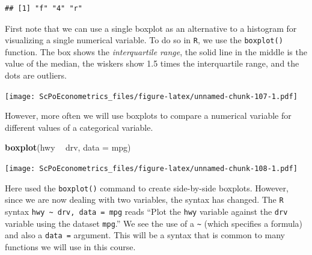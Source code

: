 \documentclass[]{book}
\newenvironment{Shaded}{\begin{snugshade}}{\end{snugshade}}
\newcommand{\KeywordTok}[1]{\textcolor[rgb]{0.13,0.29,0.53}{\textbf{#1}}}
\newcommand{\DataTypeTok}[1]{\textcolor[rgb]{0.13,0.29,0.53}{#1}}
\newcommand{\StringTok}[1]{\textcolor[rgb]{0.31,0.60,0.02}{#1}}
\newcommand{\OperatorTok}[1]{\textcolor[rgb]{0.81,0.36,0.00}{\textbf{#1}}}
\newcommand{\NormalTok}[1]{#1}
\theoremstyle{definition}
\theoremstyle{definition}
\theoremstyle{definition}
\theoremstyle{remark}
\begin{document}
\begin{Shaded}
\end{Shaded}

\begin{verbatim}
## [1] "f" "4" "r"
\end{verbatim}

First note that we can use a single boxplot as an alternative to a
histogram for visualizing a single numerical variable. To do so in
\texttt{R}, we use the \texttt{boxplot()} function. The box shows the
\emph{interquartile range}, the solid line in the middle is the value of
the median, the wiskers show 1.5 times the interquartile range, and the
dots are outliers.

\begin{Shaded}
\end{Shaded}

\texttt{[image: ScPoEconometrics\_files/figure-latex/unnamed-chunk-107-1.pdf]}

However, more often we will use boxplots to compare a numerical variable
for different values of a categorical variable.

\begin{Shaded}
\begin{Highlighting}[]
\KeywordTok{boxplot}\NormalTok{(hwy }\OperatorTok{~}\StringTok{ }\NormalTok{drv, }\DataTypeTok{data =}\NormalTok{ mpg)}
\end{Highlighting}
\end{Shaded}

\texttt{[image: ScPoEconometrics\_files/figure-latex/unnamed-chunk-108-1.pdf]}

Here used the \texttt{boxplot()} command to create side-by-side
boxplots. However, since we are now dealing with two variables, the
syntax has changed. The \texttt{R} syntax
\texttt{hwy\ \textasciitilde{}\ drv,\ data\ =\ mpg} reads ``Plot the
\texttt{hwy} variable against the \texttt{drv} variable using the
dataset \texttt{mpg}.'' We see the use of a \texttt{\textasciitilde{}}
(which specifies a formula) and also a \texttt{data\ =} argument. This
will be a syntax that is common to many functions we will use in this
course.
\end{document}
